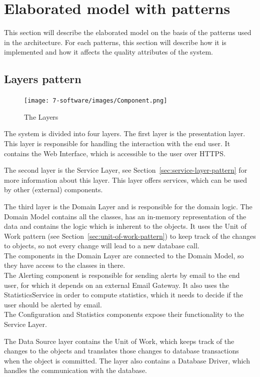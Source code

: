 
\clearpage
\section{Elaborated model with patterns}
This section will describe the elaborated model on the basis of the patterns used in the architecture. For each patterns, this section will describe how it is implemented and how it affects the quality attributes of the system.

\subsection{Layers pattern}
\begin{figure}[H]
\centering
\texttt{[image: 7-software/images/Component.png]}
\caption{The Layers}
\label{fig:layers}
\end{figure}
The system is divided into four layers. The first layer is the presentation layer. This layer is responsible for handling the interaction with the end user. It contains the Web Interface, which is accessible to the user over HTTPS.

The second layer is the Service Layer, see Section~\ref{sec:service-layer-pattern} for more information about this layer. This layer offers services, which can be used by other (external) components.

The third layer is the Domain Layer and is responsible for the domain logic. The Domain Model contains all the classes, has an in-memory representation of the data and contains the logic which is inherent to the objects.
It uses the Unit of Work pattern (see Section~\ref{sec:unit-of-work-pattern}) to keep track of the changes to objects, so not every change will lead to a new database call. \\
The components in the Domain Layer are connected to the Domain Model, so they have access to the classes in there. \\
The Alerting component is responsible for sending alerts by email to the end user, for which it depends on an external Email Gateway. It also uses the StatisticsService in order to compute statistics, which it needs to decide if the user should be alerted by email. \\
The Configuration and Statistics components expose their functionality to the Service Layer.

The Data Source layer contains the Unit of Work, which keeps track of the changes to the objects and translates those changes to database transactions when the object is committed. The layer also contains a Database Driver, which handles the communication with the database.

